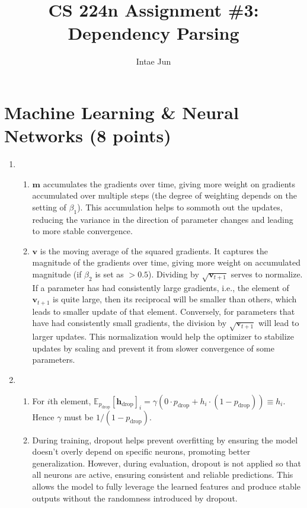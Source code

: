 \documentclass{article}
\title{\textbf{CS 224n Assignment \#3: Dependency Parsing}}
\author{Intae Jun}
\date{}
\begin{document}
\maketitle
\doublespacing

\section{Machine Learning \& Neural Networks (8 points)}
\begin{enumerate}[label=(\alph*)]
    \item \begin{enumerate}[label=\roman*.]
        \item $\bm{m}$ accumulates the gradients over time, giving more weight on gradients accumulated over multiple steps (the degree of weighting depends on the setting of $\beta_1$).
        This accumulation helps to sommoth out the updates, reducing the variance in the direction of parameter changes and leading to more stable convergence.

        \item $\bm{v}$ is the moving average of the squared gradients. It captures the magnitude of the gradients over time, giving more weight on accumulated magnitude (if $\beta_2$ is set as $>0.5$).
        Dividing by $\sqrt{\bm{v}_{t+1}}$ serves to normalize. If a parameter has had consistently large gradients, i.e., the element of $\bm{v}_{t+1}$ is quite large, then its reciprocal will be smaller than others, which leads to smaller update of that element.
        Conversely, for parameters that have had consistently small gradients, the division by $\sqrt{\bm{v}_{t+1}}$ will lead to larger updates.
        This normalization would help the optimizer to stabilize updates by scaling and prevent it from slower convergence of some parameters.
    \end{enumerate}

    \item \begin{enumerate}[label=\roman*.]
        \item For $i$th element, $\mathbb{E}_{p_\text{drop}}[\bm{h}_{\text{drop}}]_i = \gamma (0\cdot p_\text{drop} + h_i\cdot (1-p_\text{drop})) \equiv h_i$.
        Hence $\gamma$ must be $1/(1-p_\text{drop})$.

        \item During training, dropout helps prevent overfitting by ensuring the model doesn't overly depend on specific neurons, promoting better generalization.
        However, during evaluation, dropout is not applied so that all neurons are active, ensuring consistent and reliable predictions.
        This allows the model to fully leverage the learned features and produce stable outputs without the randomness introduced by dropout.
    \end{enumerate}
\end{enumerate}
\end{document}
